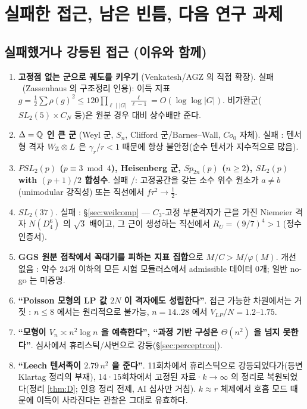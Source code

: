 \section{실패한 접근, 남은 빈틈, 다음 연구 과제}\label{sec:conclusion}

\subsection{실패했거나 강등된 접근 (이유와 함께)}
\begin{enumerate}
\item \textbf{고정점 없는 군으로 궤도를 키우기} (Venkatesh/AGZ 의 직접 확장). 실패 \tagP\ (Zassenhaus 의 구조정리 인용): 이득 지표 $g=\tfrac12\sum\rho(g)^2\le120\prod_{\ell\mid|G|}\tfrac{\ell}{\ell-1}=O(\log\log|G|)$. 비가환군($SL_2(5)\times C_N$ 등)은 원분 경우 대비 상수배만 준다.
\item \textbf{$\Delta=\mathbb{Q}$ 인 큰 군} (Weyl 군, $S_n$, Clifford 군/Barnes--Wall, $Co_0$ 자체). 실패 \tagP: 텐서형 격자 $W_{\mathbb{Z}}\otimes L$ 은 $\gamma_r/r<1$ 때문에 항상 불안정(순수 텐서가 지수적으로 많음).
\item \textbf{$PSL_2(p)$ ($p\equiv3\bmod4$), Heisenberg 군, $Sp_{2n}(p)$ ($n\ge2$), $SL_2(p)$ with $(p+1)/2$ 합성수}. 실패 \tagP/\tagH: 고정공간을 갖는 소수 위수 원소가 $a\ne b$ (unimodular 강직성) 또는 직선에서 $f\tau^2\to\tfrac12$.
\item \textbf{$SL_2(37)$}. 실패 \tagPC: \S\ref{sec:weilcomp} --- $C_3$-고정 부분격자가 근을 가진 Niemeier 격자 $N(D_4^6)$ 의 $\sqrt3$ 배이고, 그 근이 생성하는 직선에서 $R_U=(9/7)^4>1$ (정수 인증서).
\item \textbf{GGS 원분 접착에서 꼭대기를 피하는 지표 집합}으로 $M/C>M/\varphi(M)$. 개선 없음 \tagN: 약수 24개 이하의 모든 시험 모듈러스에서 admissible 데이터 0개; 일반 no-go 는 미증명.
\item \textbf{``Poisson 모형의 LP 값 $2N$ 이 격자에도 성립한다''}. 접근 가능한 차원에서는 거짓 \tagN: $n\le8$ 에서는 원리적으로 불가능, $n=14..28$ 에서 $V_{LP}/N=1.2$--$1.75$.
\item \textbf{``모형이 $V_n\asymp n^2\log n$ 을 예측한다'', ``과정 기반 구성은 $\Theta(n^2)$ 을 넘지 못한다''}. 심사에서 휴리스틱/사변으로 강등(\S\ref{sec:perceptron}).
\item \textbf{``Leech 텐서족이 $2.79\,n^2$ 을 준다''}. 11회차에서 휴리스틱으로 강등되었다가(등변 Klartag 정리의 부재), 14·15회차에서 고정된 자료·$k\to\infty$ 의 정리로 복원되었다(정리 \ref{thm:D}; 인용 정리 전제, AI 심사만 거침). $k\approx r$ 체제에서 호흡 모드 때문에 이득이 사라진다는 관찰은 그대로 유효하다.

\end{enumerate}
